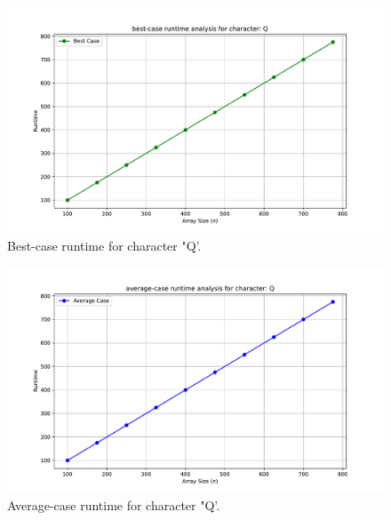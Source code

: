 \documentclass{article}
\begin{document}
        \begin{figure}[H]
		\centering
		\includegraphics[width=\textwidth]{runtime_analysis_best_Q.pdf}
		\caption{Best-case runtime for character "Q'.}
	\end{figure}

        \begin{figure}[H]
		\centering
		\includegraphics[width=\textwidth]{runtime_analysis_average_Q.pdf}
		\caption{Average-case runtime for character "Q'.}
	\end{figure}
\end{document}
